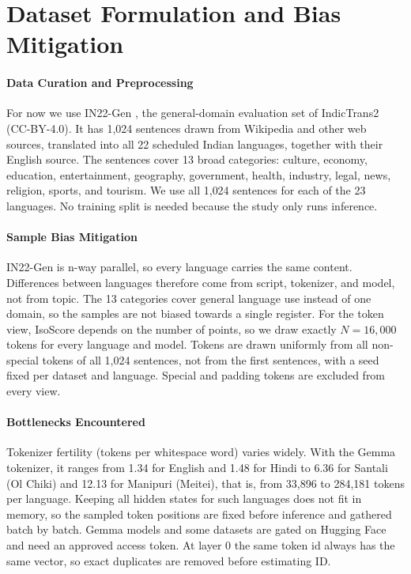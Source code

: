 \section{Dataset Formulation and Bias Mitigation}
\label{sec:app1_datasets}

\paragraph{Data Curation and Preprocessing}
For now we use IN22-Gen \citep{gala-etal-2023-indictrans2}, the general-domain evaluation set of IndicTrans2 (CC-BY-4.0). It has 1{,}024 sentences drawn from Wikipedia and other web sources, translated into all 22 scheduled Indian languages, together with their English source. The sentences cover 13 broad categories: culture, economy, education, entertainment, geography, government, health, industry, legal, news, religion, sports, and tourism. We use all 1{,}024 sentences for each of the 23 languages. No training split is needed because the study only runs inference.

\paragraph{Sample Bias Mitigation}
IN22-Gen is n-way parallel, so every language carries the same content. Differences between languages therefore come from script, tokenizer, and model, not from topic. The 13 categories cover general language use instead of one domain, so the samples are not biased towards a single register. For the token view, IsoScore depends on the number of points, so we draw exactly $N = 16{,}000$ tokens for every language and model. Tokens are drawn uniformly from all non-special tokens of all 1{,}024 sentences, not from the first sentences, with a seed fixed per dataset and language. Special and padding tokens are excluded from every view.

\paragraph{Bottlenecks Encountered}
Tokenizer fertility (tokens per whitespace word) varies widely. With the Gemma tokenizer, it ranges from 1.34 for English and 1.48 for Hindi to 6.36 for Santali (Ol Chiki) and 12.13 for Manipuri (Meitei), that is, from 33{,}896 to 284{,}181 tokens per language. Keeping all hidden states for such languages does not fit in memory, so the sampled token positions are fixed before inference and gathered batch by batch. Gemma models and some datasets are gated on Hugging Face and need an approved access token. At layer 0 the same token id always has the same vector, so exact duplicates are removed before estimating ID.

